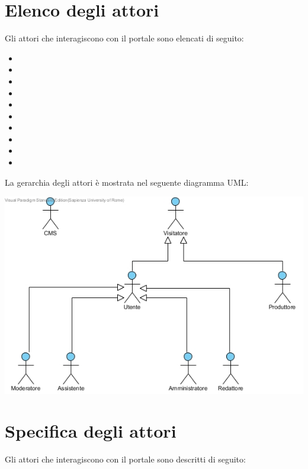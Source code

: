 \section{Elenco degli attori}
Gli attori che interagiscono con il portale sono elencati di seguito:
\begin{itemize}
	\item {}
	\item {}
	\item {}
	\item {}
	\item {}
	\item {}
	\item {}
	\item {}
	\item {}
	\item {}
\end{itemize}
La gerarchia degli attori è mostrata nel seguente diagramma UML:
\begin{center}
   \includegraphics[width=\textwidth]{assets/visualParadigm/SchemaAttori}
\end{center}

\section{Specifica degli attori}
Gli attori che interagiscono con il portale sono descritti di seguito:

